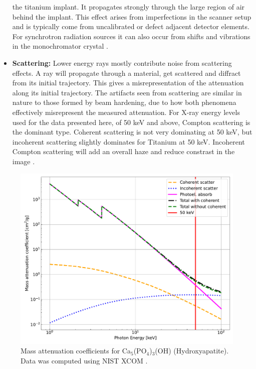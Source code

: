 \begin{itemize}
		the titanium implant. It propagates strongly through the large
		region of air behind the implant. This effect arises from
		imperfections in the scanner setup and is typically come from
		uncalibrated or defect adjacent detector elements. For
		synchrotron radiation sources it can also occur from shifts and
		vibrations in the monochromator crystal \citep{ringartefacts}.
	\item \textbf{Scattering:} Lower energy rays mostly contribute noise
		from scattering effects. A ray will propagate through a
		material, get scattered and diffract from its initial
		trajectory. This gives a misrepresentation of the attenuation
		along its initial trajectory. The artifacts seen from
		scattering are similar in nature to those formed by beam
		hardening, due to how both phenomena effectively misrepresent
		the measured attenuation.  For X-ray energy levels used for the
		data presented here, of 50 keV and above, Compton scattering is
		the dominant type.  Coherent scattering is not very dominating
		at 50 keV, but incoherent scattering slightly dominates for
		Titanium at 50 keV. Incoherent Compton scattering will add an
		overall haze and reduce constrast in the image
		\citep{Compton}\citep{xray-attenuation-10-kev-100-mev}\citep{attenuation-cross-sections}.
\end{itemize}

\begin{figure}
    \centering
    \includegraphics[width=\linewidth]{figures/attenuation_hydroxyapatite.pdf}
    \caption{
	    Mass attenuation coefficients for Ca$_{5}$(PO$_{4}$)$_{3}$(OH) (Hydroxyapatite).
	    Data was computed using NIST XCOM \citep{NIST-XCOM}.
    }
    \label{fig:attenuation}
\end{figure}

